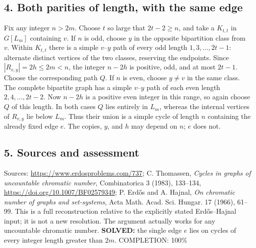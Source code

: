 \subsection*{4. Both parities of length, with the same edge}
Fix any integer $n>2m$. Choose $t$ so large that $2t-2\ge n$, and take a $K_{t,t}$ in $G[L_m]$ containing $v$.
If $n$ is odd, choose $y$ in the opposite bipartition class from $v$. Within $K_{t,t}$ there is a simple $v$--$y$ path of every odd length $1,3,\ldots,2t-1$: alternate distinct vertices of the two classes, reserving the endpoints. Since $|R_{v,y}|=2h\le2m<n$, the integer $n-2h$ is positive, odd, and at most $2t-1$. Choose the corresponding path $Q$.
If $n$ is even, choose $y\ne v$ in the same class. The complete bipartite graph has a simple $v$--$y$ path of each even length $2,4,\ldots,2t-2$. Now $n-2h$ is a positive even integer in this range, so again choose $Q$ of this length.
In both cases $Q$ lies entirely in $L_m$, whereas the internal vertices of $R_{v,y}$ lie below $L_m$. Thus their union is a simple cycle of length $n$ containing the already fixed edge $e$. The copies, $y$, and $h$ may depend on $n$; $e$ does not.
\subsection*{5. Sources and assessment}
Sources: \url{https://www.erdosproblems.com/737}; C. Thomassen, \emph{Cycles in graphs of uncountable chromatic number}, Combinatorica 3 (1983), 133--134, \url{https://doi.org/10.1007/BF02579349}; P. Erd\H{o}s and A. Hajnal, \emph{On chromatic number of graphs and set-systems}, Acta Math. Acad. Sci. Hungar. 17 (1966), 61--99.
This is a full reconstruction relative to the explicitly stated Erd\H{o}s--Hajnal input; it is not a new resolution. The argument actually works for any uncountable chromatic number.
\textbf{SOLVED:} the single edge $e$ lies on cycles of every integer length greater than $2m$.
\noindent COMPLETION: 100\%

